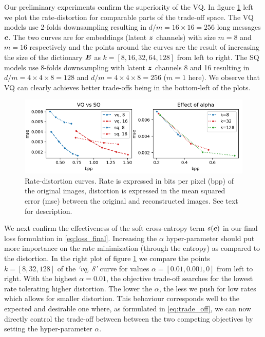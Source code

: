 \documentclass{article} %
\begin{document}
Our preliminary experiments confirm the superiority of the VQ. In figure \ref{fig:plots} left we plot the rate-distortion for comparable parts of the trade-off space.
The VQ models use 2-folds downsampling resulting in $d/m = 16 \times 16 = 256$ long messages ${\bm{c}}$.
The two curves are for embeddings (latent ${\bm{z}}$ channels) with size $m=8$ and $m=16$ respectively and the points around the curves are the result of increasing the size of the dictionary ${\bm{E}}$ as $k = [8, 16, 32, 64, 128]$ from left to right.
The SQ models use 8-folds downsampling with latent ${\bm{z}}$ channels 8 and 16 resulting in $d/m = 4 \times 4 \times 8 = 128$ and $d/m = 4 \times 4 \times 8 = 256$ ($m=1$ here). We observe that VQ can clearly achieves better trade-offs being in the bottom-left of the plots.


\begin{figure}[h]
\begin{center}
\includegraphics[scale=0.7]{figure1.png}
\end{center}
\caption{Rate-distortion curves. Rate is expressed in bits per pixel (bpp) of the original images, distortion is expressed in the mean squared error (mse) between the original and reconstructed images. See text for description.}\label{fig:plots}
\end{figure}

We next confirm the effectiveness of the soft cross-entropy term $s({\bm{c}})$ in our final loss formulation in \eqref{eq:loss_final}.
Increasing the $\alpha$ hyper-parameter should put more importance on the rate minimization (through the entropy) as compared to the distortion.
In the right plot of figure \ref{fig:plots} we compare the points $k=[8, 32, 128]$ of the \emph{`vq, 8'} curve for values $\alpha = [0.01, 0.001, 0]$ from left to right.
With the highest $\alpha = 0.01$, the objective trade-off searches for the lowest rate tolerating higher distortion. The lower the $\alpha$, the less we push for low rates which allows for smaller distortion. 
This behaviour corresponds well to the expected and desirable one where, as formulated in \eqref{eq:trade_off}, we can now directly control the trade-off between between the two competing objectives by setting the hyper-parameter $\alpha$.
\end{document}
